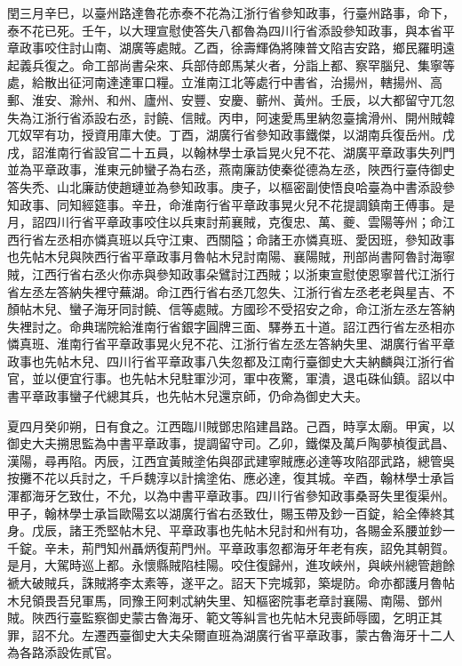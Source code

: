 \begin{pinyinscope}
 閏三月辛巳，以臺州路達魯花赤泰不花為江浙行省參知政事，行臺州路事，命下，泰不花已死。壬午，以大理宣慰使答失八都魯為四川行省添設參知政事，與本省平章政事咬住討山南、湖廣等處賊。乙酉，徐壽輝偽將陳普文陷吉安路，鄉民羅明遠起義兵復之。命工部尚書朵來、兵部侍郎馬某火者，分詣上都、察罕腦兒、集寧等處，給散出征河南達達軍口糧。立淮南江北等處行中書省，治揚州，轄揚州、高郵、淮安、滁州、和州、廬州、安豐、安慶、蘄州、黃州。壬辰，以大都留守兀忽失為江浙行省添設右丞，討饒、信賊。丙申，阿速愛馬里納忽臺擒滑州、開州賊韓兀奴罕有功，授資用庫大使。丁酉，湖廣行省參知政事鐵傑，以湖南兵復岳州。戊戌，詔淮南行省設官二十五員，以翰林學士承旨晃火兒不花、湖廣平章政事失列門並為平章政事，淮東元帥蠻子為右丞，燕南廉訪使秦從德為左丞，陜西行臺侍御史答失禿、山北廉訪使趙璉並為參知政事。庚子，以樞密副使悟良哈臺為中書添設參知政事、同知經筵事。辛丑，命淮南行省平章政事晃火兒不花提調鎮南王傅事。是月，詔四川行省平章政事咬住以兵東討荊襄賊，克復忠、萬、夔、雲陽等州；命江西行省左丞相亦憐真班以兵守江東、西關隘；命諸王亦憐真班、愛因班，參知政事也先帖木兒與陜西行省平章政事月魯帖木兒討南陽、襄陽賊，刑部尚書阿魯討海寧賊，江西行省右丞火你赤與參知政事朵鷿討江西賊；以浙東宣慰使恩寧普代江浙行省左丞左答納失裡守蕪湖。命江西行省右丞兀忽失、江浙行省左丞老老與星吉、不顏帖木兒、蠻子海牙同討饒、信等處賊。方國珍不受招安之命，命江浙左丞左答納失裡討之。命典瑞院給淮南行省銀字圓牌三面、驛券五十道。詔江西行省左丞相亦憐真班、淮南行省平章政事晃火兒不花、江浙行省左丞左答納失里、湖廣行省平章政事也先帖木兒、四川行省平章政事八失忽都及江南行臺御史大夫納麟與江浙行省官，並以便宜行事。也先帖木兒駐軍沙河，軍中夜驚，軍潰，退屯硃仙鎮。詔以中書平章政事蠻子代總其兵，也先帖木兒還京師，仍命為御史大夫。



 夏四月癸卯朔，日有食之。江西臨川賊鄧忠陷建昌路。己酉，時享太廟。甲寅，以御史大夫搠思監為中書平章政事，提調留守司。乙卯，鐵傑及萬戶陶夢楨復武昌、漢陽，尋再陷。丙辰，江西宜黃賊塗佑與邵武建寧賊應必達等攻陷邵武路，總管吳按攤不花以兵討之，千戶魏淳以計擒塗佑、應必達，復其城。辛酉，翰林學士承旨渾都海牙乞致仕，不允，以為中書平章政事。四川行省參知政事桑哥失里復渠州。甲子，翰林學士承旨歐陽玄以湖廣行省右丞致仕，賜玉帶及鈔一百錠，給全俸終其身。戊辰，諸王禿堅帖木兒、平章政事也先帖木兒討和州有功，各賜金系腰並鈔一千錠。辛未，荊門知州聶炳復荊門州。平章政事忽都海牙年老有疾，詔免其朝賀。是月，大駕時巡上都。永懷縣賊陷桂陽。咬住復歸州，進攻峽州，與峽州總管趙餘褫大破賊兵，誅賊將李太素等，遂平之。詔天下完城郭，築堤防。命亦都護月魯帖木兒領畏吾兒軍馬，同豫王阿剌忒納失里、知樞密院事老章討襄陽、南陽、鄧州賊。陜西行臺監察御史蒙古魯海牙、範文等糾言也先帖木兒喪師辱國，乞明正其罪，詔不允。左遷西臺御史大夫朵爾直班為湖廣行省平章政事，蒙古魯海牙十二人為各路添設佐貳官。




\end{pinyinscope}
